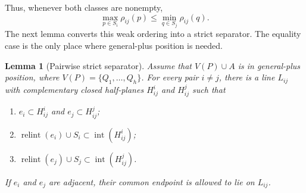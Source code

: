 \documentclass[final,5p,times,twocolumn]{elsarticle}
\newtheorem{lemma}[lemma]{Lemma}
\theoremstyle{definition}
\theoremstyle{remark}
\newcommand{\interior}[1]{\operatorname{int}(#1)}
\newcommand{\relint}{\operatorname{relint}}
\newcommand{\ratio}{\rho}
\begin{document}
Thus, whenever both classes are nonempty,
\begin{equation}
\max_{p\in S_i}\ratio_{ij}(p)
\leq
\min_{q\in S_j}\ratio_{ij}(q).
\label{eq:ordered-intervals}
\end{equation}
The next lemma converts this weak ordering into a strict separator. The equality case is the only place where general-plus position is needed.

\begin{lemma}[Pairwise strict separator]
\label{lem:separator}
Assume that $V(P)\cup A$ is in general-plus position, where $V(P)=\{Q_1,\ldots,Q_h\}$. For every pair $i\neq j$, there is a line $L_{ij}$ with complementary closed half-planes $H_{ij}^{i}$ and $H_{ij}^{j}$ such that
\begin{enumerate}[label=\textup{(\roman*)}]
\item $e_i\subset H_{ij}^{i}$ and $e_j\subset H_{ij}^{j}$;
\item $\relint(e_i)\cup S_i\subset\interior{H_{ij}^{i}}$;
\item $\relint(e_j)\cup S_j\subset\interior{H_{ij}^{j}}$.
\end{enumerate}
If $e_i$ and $e_j$ are adjacent, their common endpoint is allowed to lie on $L_{ij}$.
\end{lemma}
\end{document}

